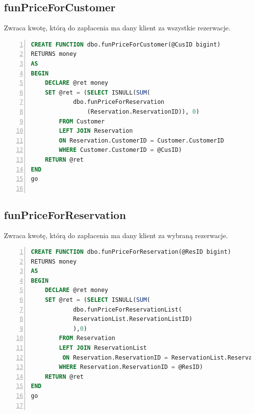 \documentclass[]{article}
\begin{document}
	\subsection{funPriceForCustomer}
	Zwraca kwotę, którą do zapłacenia ma dany klient za wszystkie rezerwacje.
	\begin{lstlisting}[language=SQL,
	showspaces=false,
	basicstyle=\ttfamily,
	numbers=left,
	numberstyle=\tiny,
	backgroundcolor=\color{lightg},
	keywordstyle=\color{lightblue},
	commentstyle=\color{gray}]
CREATE FUNCTION dbo.funPriceForCustomer(@CusID bigint)
RETURNS money
AS 
BEGIN
	DECLARE @ret money
	SET @ret = (SELECT ISNULL(SUM(
			dbo.funPriceForReservation
				(Reservation.ReservationID)), 0)
		FROM Customer
		LEFT JOIN Reservation
		ON Reservation.CustomerID = Customer.CustomerID
		WHERE Customer.CustomerID = @CusID)
	RETURN @ret
END
go
	
	\end{lstlisting}
	
	\subsection{funPriceForReservation}
	Zwraca kwotę, którą do zapłacenia ma dany klient za wybraną rezerwacje.
	\begin{lstlisting}[language=SQL,
	showspaces=false,
	basicstyle=\ttfamily,
	numbers=left,
	numberstyle=\tiny,
	backgroundcolor=\color{lightg},
	keywordstyle=\color{lightblue},
	commentstyle=\color{gray}]
CREATE FUNCTION dbo.funPriceForReservation(@ResID bigint)
RETURNS money
AS
BEGIN
	DECLARE @ret money
	SET @ret = (SELECT ISNULL(SUM(
			dbo.funPriceForReservationList(
			ReservationList.ReservationListID)
			),0)
		FROM Reservation
		LEFT JOIN ReservationList
		 ON Reservation.ReservationID = ReservationList.ReservationID
		WHERE Reservation.ReservationID = @ResID)
	RETURN @ret
END
go
	
	\end{lstlisting}
	
\end{document}
